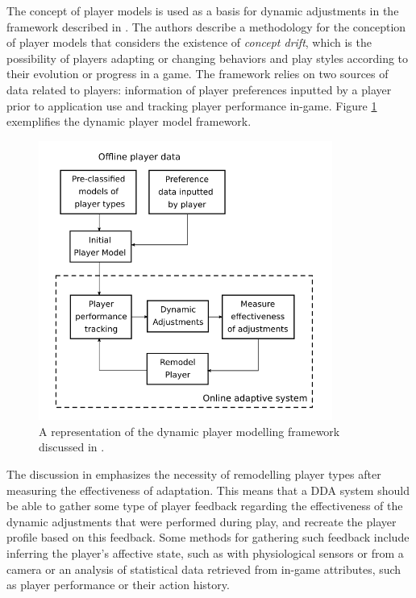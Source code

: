 The concept of player models is used as a basis for dynamic adjustments in the framework described in \citet{ARTICLE_DynamicPlayerModelling}. The authors describe a methodology for the conception of player models that considers the existence of \emph{concept drift}, which is the possibility of players adapting or changing behaviors and play styles according to their evolution or progress in a game. The framework relies on two sources of data related to players: information of player preferences inputted by a player prior to application use and tracking player performance in-game. Figure \ref{fig:dynamic-player-model} exemplifies the dynamic player model framework.

\begin{figure}[!ht]
    \caption{A representation of the dynamic player modelling framework discussed in \citet{ARTICLE_DynamicPlayerModelling}.}
    \begin{center}
        \includegraphics[width=26em]{figures/fig-dynamic-player-model.png}
    \end{center}
    \label{fig:dynamic-player-model}
\end{figure}

The discussion in \citet{ARTICLE_DynamicPlayerModelling} emphasizes the necessity of remodelling player types after measuring the effectiveness of adaptation. This means that a DDA system should be able to gather some type of player feedback regarding the effectiveness of the dynamic adjustments that were performed during play, and recreate the player profile based on this feedback. Some methods for gathering such feedback include inferring the player's affective state, such as with physiological sensors or from a camera or an analysis of statistical data retrieved from in-game attributes, such as player performance or their action history.

